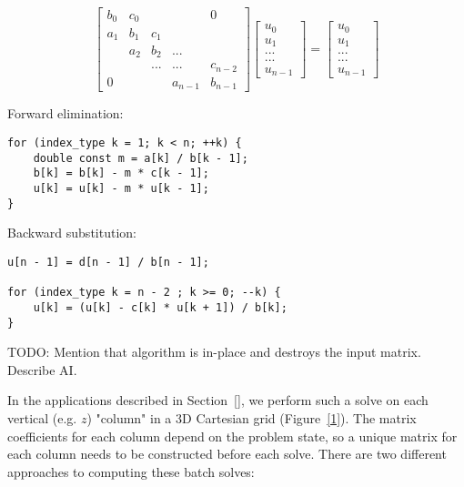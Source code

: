 \documentclass[conference]{IEEEtran}
\begin{document}
\[
\begin{bmatrix}
b_0 & c_0 &     &         & 0       \\
a_1 & b_1 & c_1 &         &         \\
    & a_2 & b_2 & ...     &         \\
    &     & ... & ...     & c_{n-2} \\
0   &     &     & a_{n-1} & b_{n-1}
\end{bmatrix}
\begin{bmatrix}
u_0     \\
u_1     \\
...     \\
...     \\
u_{n-1}
\end{bmatrix}
=
\begin{bmatrix}
u_0     \\
u_1     \\
...     \\
...     \\
u_{n-1}
\end{bmatrix}
\]

Forward elimination:

\begin{lstlisting}
for (index_type k = 1; k < n; ++k) {
    double const m = a[k] / b[k - 1];
    b[k] = b[k] - m * c[k - 1];
    u[k] = u[k] - m * u[k - 1];
} 
\end{lstlisting}

Backward substitution:

\begin{lstlisting}
u[n - 1] = d[n - 1] / b[n - 1];

for (index_type k = n - 2 ; k >= 0; --k) {
    u[k] = (u[k] - c[k] * u[k + 1]) / b[k];
} 
\end{lstlisting}

TODO: Mention that algorithm is in-place and destroys the input matrix. Describe
AI.

In the applications described in Section~\ref{}, we perform such a solve on
each vertical (e.g. \(z\)) "column" in a 3D Cartesian grid (Figure~\ref{1}). The
matrix coefficients for each column depend on the problem state, so a unique
matrix for each column needs to be constructed before each solve. There are two
different approaches to computing these batch solves:
\end{document}
